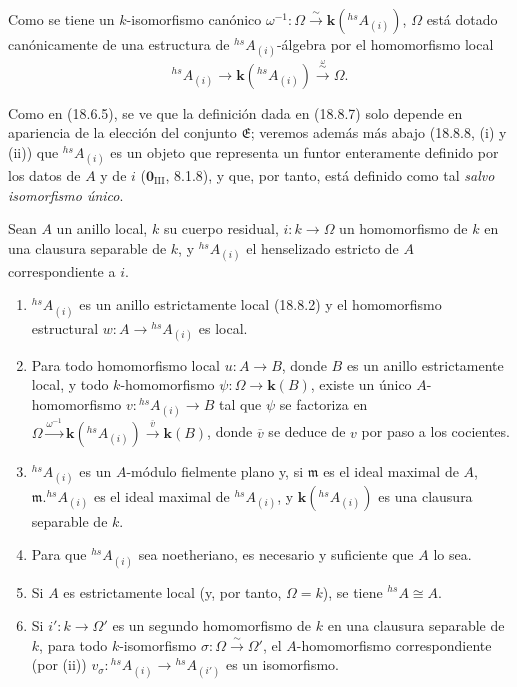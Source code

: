 Como se tiene un $k$-isomorfismo canónico $\omega^{-1}:\Omega\xrightarrow{\sim}\boldsymbol{k}({}^{hs}\!A_{(i)})$, $\Omega$ está dotado canónicamente de una estructura de ${}^{hs}\!A_{(i)}$-álgebra por el homomorfismo local
\[
  {}^{hs}\!A_{(i)}\longrightarrow\boldsymbol{k}({}^{hs}\!A_{(i)})\xrightarrow{\overset{\omega}{\sim}}\Omega.
\]

Como en (18.6.5), se ve que la definición dada en (18.8.7) solo depende en apariencia de la elección del conjunto $\mathfrak E$; veremos además más abajo (18.8.8, (i) y (ii)) que ${}^{hs}\!A_{(i)}$ es un objeto que representa un funtor enteramente definido por los datos de $A$ y de $i$ ($\mathbf{0}_{\mathrm{III}}$, 8.1.8), y que, por tanto, está definido como tal \emph{salvo isomorfismo único}.

\begin{proposition}[18.8.8]
\label{IV.18.8.8}
Sean $A$ un anillo local, $k$ su cuerpo residual, $i:k\to\Omega$ un homomorfismo de $k$ en una clausura separable de $k$, y ${}^{hs}\!A_{(i)}$ el henselizado estricto de $A$ correspondiente a $i$.
\begin{enumerate}
  \item[\textup{(i)}] ${}^{hs}\!A_{(i)}$ es un anillo estrictamente local \textup{(18.8.2)} y el homomorfismo estructural $w:A\to{}^{hs}\!A_{(i)}$ es local.
  \item[\textup{(ii)}] Para todo homomorfismo local $u:A\to B$, donde $B$ es un anillo estrictamente local, y todo $k$-homomorfismo $\psi:\Omega\to\boldsymbol{k}(B)$, existe un único $A$-homomorfismo $v:{}^{hs}\!A_{(i)}\to B$ tal que $\psi$ se factoriza en $\Omega\xrightarrow{\omega^{-1}}\boldsymbol{k}({}^{hs}\!A_{(i)})\xrightarrow{\overline v}\boldsymbol{k}(B)$, donde $\overline v$ se deduce de $v$ por paso a los cocientes.


  \item[\textup{(iii)}] ${}^{hs}\!A_{(i)}$ es un $A$-módulo fielmente plano y, si $\mathfrak m$ es el ideal maximal de $A$, $\mathfrak m.{}^{hs}\!A_{(i)}$ es el ideal maximal de ${}^{hs}\!A_{(i)}$, y $\boldsymbol{k}({}^{hs}\!A_{(i)})$ es una clausura separable de $k$.
  \item[\textup{(iv)}] Para que ${}^{hs}\!A_{(i)}$ sea noetheriano, es necesario y suficiente que $A$ lo sea.
  \item[\textup{(v)}] Si $A$ es estrictamente local (y, por tanto, $\Omega=k$), se tiene ${}^{hs}\!A\cong A$.
  \item[\textup{(vi)}] Si $i':k\to\Omega'$ es un segundo homomorfismo de $k$ en una clausura separable de $k$, para todo $k$-isomorfismo $\sigma:\Omega\xrightarrow{\sim}\Omega'$, el $A$-homomorfismo correspondiente \textup{(}por \textup{(ii))} $v_\sigma:{}^{hs}\!A_{(i)}\to{}^{hs}\!A_{(i')}$ es un isomorfismo.
\end{enumerate}
\end{proposition}

